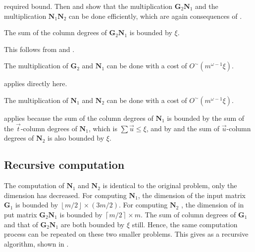 required bound. Then  and 
show that the multiplication $\mathbf{G}_{2}\mathbf{N}_{1}$ and the
multiplication $\mathbf{N}_{1}\mathbf{N}_{2}$ can be done efficiently,
which are again consequences of .
\begin{lem}
\label{lem:sizeOfG2N1}The sum of the column degrees of $\mathbf{G}_{2}\mathbf{N}_{1}$
is bounded by $\xi$.\end{lem}
\begin{pf}
This follows from 
and .\end{pf}
\begin{lem}
\label{lem:mutiplyingG2N1}The multiplication of $\mathbf{G}_{2}$
and $\mathbf{N}_{1}$ can be done with a cost of $O^{\sim}(m^{\omega-1}\xi)$.\end{lem}
\begin{pf}
 applies directly here.\end{pf}
\begin{lem}
\label{lem:multiplyingN1N2}The multiplication of $\mathbf{N}_{1}$
and $\mathbf{N}_{2}$ can be done with a cost of $O^{\sim}(m^{\omega-1}\xi)$.\end{lem}
\begin{pf}
 applies because the sum
of the column degrees of $\mathbf{N}_{1}$ is bounded by the sum of
the $\vec{t}$-column degrees of $\mathbf{N}_{1}$, which is $\sum\vec{u}\le\xi$,
and by  and 
the sum of $\vec{u}$-column degrees of $\mathbf{N}_{2}$ is also
bounded by $\xi$.
\end{pf}

\subsection{Recursive computation}

The computation of $\mathbf{N}_{1}$ and $\mathbf{N}_{2}$ is identical
to the original problem, only the dimension has decreased. For computing
$\mathbf{N}_{1}$, the dimension of the input matrix $\mathbf{G}_{1}$
is bounded by $\left\lfloor m/2\right\rfloor \times\left(3m/2\right)$.
For computing $\mathbf{N}_{2}$ , the dimension of in put matrix $\mathbf{G}_{2}\mathbf{N}_{1}$
is bounded by $\left\lceil m/2\right\rceil \times m$. The sum of
column degrees of $\mathbf{G}_{1}$ and that of $\mathbf{G}_{2}\mathbf{N}_{1}$
are both bounded by $\xi$ still. Hence, the same computation process
can be repeated on these two smaller problems. This gives as a recursive
algorithm, shown in . 

